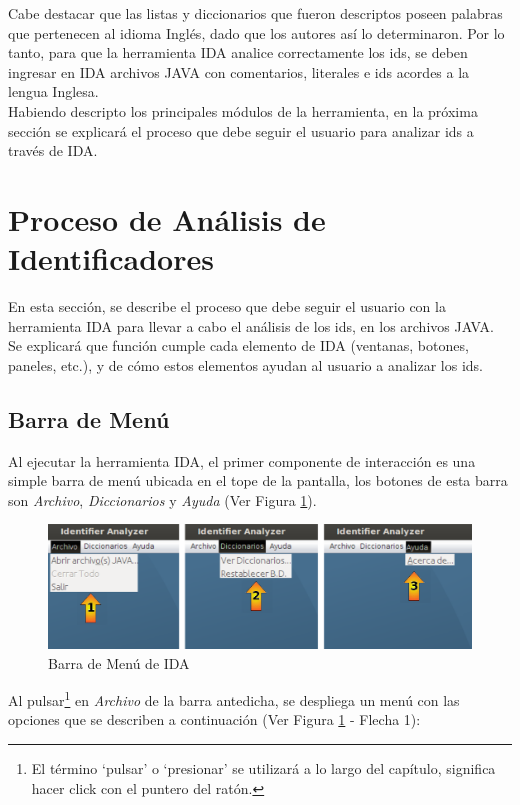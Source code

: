 Cabe destacar que las listas y diccionarios que fueron descriptos poseen palabras que pertenecen al idioma Inglés, dado que los autores así lo determinaron. Por lo tanto, para que la herramienta IDA analice correctamente los ids, se deben ingresar en IDA archivos JAVA con comentarios, literales e ids acordes a la lengua Inglesa.\\ 

Habiendo descripto los principales módulos de la herramienta, en la próxima sección se explicará el proceso que debe seguir el usuario para analizar ids a través de IDA.
 
\section{Proceso de Análisis de Identificadores}

En esta sección, se describe el proceso que debe seguir el usuario con la herramienta IDA para llevar a cabo el análisis de los ids, en los archivos JAVA. Se explicará que función cumple cada elemento de IDA (ventanas, botones, paneles, etc.), y de cómo estos elementos ayudan al usuario a analizar los ids.

\subsection{Barra de Menú}

Al ejecutar la herramienta IDA, el primer componente de interacción es una simple barra de menú ubicada en el tope de la pantalla, los botones de esta barra son \textit{Archivo}, \textit{Diccionarios} y \textit{Ayuda} (Ver Figura \ref{ida1}). 

\begin{figure}[t] %
\centerline{%
\includegraphics[scale= 0.46]{./cap4/ida_01.png}
}
\caption{Barra de Menú de IDA}
\label{ida1}
\end{figure}

Al pulsar\footnote[2]{El término `pulsar' o `presionar' se utilizará a lo largo del capítulo, significa hacer click con el puntero del ratón.} en \textit{Archivo} de la barra antedicha, se despliega un menú con las opciones que se describen a continuación (Ver Figura \ref{ida1} - Flecha 1):

